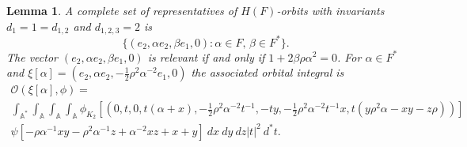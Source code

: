 \documentclass[12pt]{amsart}
\newcommand{\abs}[1]{\left|{#1}\right|}
\newcommand{\A}{\mathbb{A}}
\renewcommand{\O}{\mathcal{O}}
\newtheorem{lemma}[theorem]{Lemma}
\theoremstyle{remark}
\begin{document}
\begin{lemma}\label{relevant-3}
A complete set of representatives of $H(F)$-orbits with invariants $d_1=1=d_{1,2}$ and $d_{1,2,3}=2$ is 
\[
\{(e_2,\alpha e_2,\beta e_1,0):\alpha\in F,\,\beta\in F^*\}.
\]
The vector $(e_2,\alpha e_2,\beta e_1,0)$ is relevant if and only if $1+2\beta\rho\alpha^2=0$. For $\alpha\in F^*$ and $\xi[\alpha]=(e_2,\alpha e_2,-\frac12 \rho^2\alpha^{-2} e_1,0)$ the associated orbital integral is
\begin{multline*}
\O(\xi[\alpha],\phi)=\\
\int_{\A^*}\int_\A\int_\A\int_\A \phi_{K_2}[(0,t,0,t(\alpha+x),-\frac12 \rho^2\alpha^{-2} t^{-1},-ty,-\frac12 \rho^2\alpha^{-2}t^{-1} x,t(y\rho^2\alpha-xy-z\rho))]\\ \psi[-\rho\alpha^{-1} xy-\rho^2\alpha^{-1}z+ \alpha^{-2}xz+x+y] \ dx\ dy\ dz\abs{t}^2\ d^*t.
\end{multline*}

\end{lemma}
\end{document}

